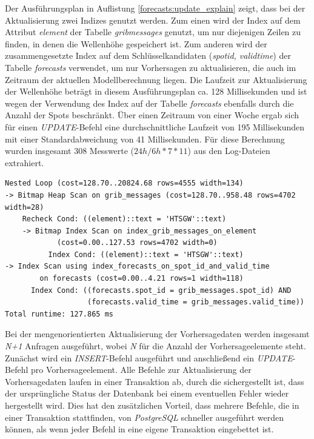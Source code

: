 Der Ausführungsplan in Auflistung \ref{forecasts:update_explain}
zeigt, dass bei der Aktualisierung zwei Indizes genutzt werden. Zum
einen wird der Index auf dem Attribut \textit{element} der Tabelle
\textit{grib\textunderscore messages} genutzt, um nur diejenigen
Zeilen zu finden, in denen die Wellenhöhe gespeichert ist. Zum anderen
wird der zusammengesetzte Index auf dem Schlüsselkandidaten
(\textit{spot\textunderscore id, valid\textunderscore time}) der
Tabelle \textit{forecasts} verwendet, um nur Vorhersagen zu
aktualisieren, die auch im Zeitraum der aktuellen Modellberechnung
liegen. Die Laufzeit zur Aktualisierung der Wellenhöhe beträgt in
diesem Ausführungsplan ca. 128 Millisekunden und ist wegen der
Verwendung des Index auf der Tabelle \textit{forecasts} ebenfalls
durch die Anzahl der Spots beschränkt. Über einen Zeitraum von einer
Woche ergab sich für einen \textit{UPDATE}-Befehl eine
durchschnittliche Laufzeit von 195 Millisekunden mit einer
Standardabweichung von 41 Millisekunden. Für diese Berechnung wurden
insgesamt 308 Messwerte ($24h/6h * 7 * 11$) aus den Log-Dateien
extrahiert.

\begin{lstlisting}[captionpos=b, caption=Ausführungsplan der Aktualisierung, label=forecasts:update_explain]
Nested Loop (cost=128.70..20824.68 rows=4555 width=134)
-> Bitmap Heap Scan on grib_messages (cost=128.70..958.48 rows=4702 width=28)
    Recheck Cond: ((element)::text = 'HTSGW'::text)
    -> Bitmap Index Scan on index_grib_messages_on_element 
            (cost=0.00..127.53 rows=4702 width=0)
          Index Cond: ((element)::text = 'HTSGW'::text)
-> Index Scan using index_forecasts_on_spot_id_and_valid_time 
        on forecasts (cost=0.00..4.21 rows=1 width=118)
      Index Cond: ((forecasts.spot_id = grib_messages.spot_id) AND
                   (forecasts.valid_time = grib_messages.valid_time))
Total runtime: 127.865 ms
\end{lstlisting}

Bei der mengenorientierten Aktualisierung der Vorhersagedaten werden
insgesamt \textit{N+1} Anfragen ausgeführt, wobei \textit{N} für die
Anzahl der Vorhersageelemente steht. Zunächst wird ein
\textit{INSERT}-Befehl ausgeführt und anschließend ein
\textit{UPDATE}-Befehl pro Vorhersageelement. Alle Befehle zur
Aktualisierung der Vorhersagedaten laufen in einer Transaktion ab,
durch die sichergestellt ist, dass der ursprüngliche Status der
Datenbank bei einem eventuellen Fehler wieder hergestellt wird. Dies
hat den zusätzlichen Vorteil, dass mehrere Befehle, die in einer
Transaktion stattfinden, von \textit{PostgreSQL} schneller ausgeführt
werden können, als wenn jeder Befehl in eine eigene Transaktion
eingebettet ist.

